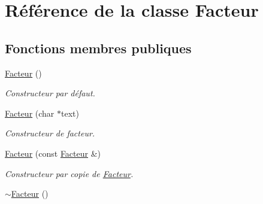 \hypertarget{classFacteur}{
\section{Référence de la classe Facteur}
\label{classFacteur}
}
\subsection*{Fonctions membres publiques}
\begin{DoxyCompactItemize}
\item 
\hypertarget{classFacteur_a989e3e6f53f97d5adfd2e7e3fc1f4cf1}{
\hyperlink{classFacteur_a989e3e6f53f97d5adfd2e7e3fc1f4cf1}{Facteur} ()}
\label{classFacteur_a989e3e6f53f97d5adfd2e7e3fc1f4cf1}

\begin{DoxyCompactList}\small\item\em Constructeur par défaut. \item\end{DoxyCompactList}\item 
\hyperlink{classFacteur_af0d4423b4ebe026d9dbe8ef06eb23d9f}{Facteur} (char $\ast$text)
\begin{DoxyCompactList}\small\item\em Constructeur de facteur. \item\end{DoxyCompactList}\item 
\hyperlink{classFacteur_af4d89bb8686ed0577646decd93406981}{Facteur} (const \hyperlink{classFacteur}{Facteur} \&)
\begin{DoxyCompactList}\small\item\em Constructeur par copie de \hyperlink{classFacteur}{Facteur}. \item\end{DoxyCompactList}\item 
\hypertarget{classFacteur_a71486fcb174b3a49520bf1e60fbf8e69}{
\hyperlink{classFacteur_a71486fcb174b3a49520bf1e60fbf8e69}{$\sim$Facteur} ()}
\label{classFacteur_a71486fcb174b3a49520bf1e60fbf8e69}


\end{DoxyCompactItemize}
